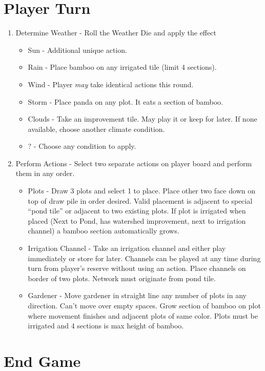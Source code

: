 \documentclass[12pt]{article}
\newenvironment{enumerateCustom}
{\begin{enumerate}
  \setlength{\itemsep}{1pt}
  \setlength{\parskip}{0pt}
  \setlength{\parsep}{0pt}}
{\end{enumerate}}
\newenvironment{itemizeCustom}
{\begin{itemize}
  \setlength{\itemsep}{1pt}
  \setlength{\parskip}{0pt}
  \setlength{\parsep}{0pt}}
{\end{itemize}}
\begin{document}
\begin{mdframed}[style = customFrame]
\begin{multicols*}{2}
\section*{Player Turn}
\begin{enumerateCustom}
	\item Determine Weather - Roll the Weather Die and apply the effect
		\begin{itemizeCustom}
			\item Sun - Additional unique action.
			\item Rain - Place bamboo on any irrigated tile (limit 4 sections).
			\item Wind - Player \emph{may} take identical actions this round.
			\item Storm - Place panda on any plot. It eats a section of bamboo.
			\item Clouds - Take an improvement tile. May play it or keep for later. If none available, choose another climate condition.
			\item ? - Choose any condition to apply.
		\end{itemizeCustom}
	\item Perform Actions - Select two separate actions on player board and perform them in any order.
		\begin{itemizeCustom}
			\item Plots - Draw 3 plots and select 1 to place. Place other two face down on top of draw pile in order desired. Valid placement is adjacent to special ``pond tile'' or adjacent to two existing plots. If plot is irrigated when placed (Next to Pond, has watershed improvement, next to irrigation channel) a bamboo section automatically grows.
			\item Irrigation Channel - Take an irrigation channel and either play immediately or store for later. Channels can be played at any time during turn from player's reserve without using an action. Place channels on border of two plots. Network must originate from pond tile.
			\item Gardener - Move gardener in straight line any number of plots in any direction. Can't move over empty spaces. Grow section of bamboo on plot where movement finishes and adjacent plots of same color. Plots must be irrigated and 4 sections is max height of bamboo.
		\end{itemizeCustom}
\end{enumerateCustom}
\section*{End Game}

\end{multicols*}
\end{mdframed}
\end{document}
